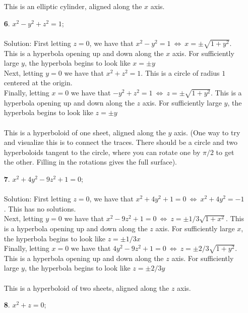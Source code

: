 \documentclass[12pt]{amsbook}
\begin{document}
\begin{enumerate}
\\
\\
This is an elliptic cylinder, aligned along the $x$ axis.
\\
\item[{\small\bf 6}.]\quad  $x^2-y^2+z^2=1$;
\\
\\
{\sc Solution}: First letting $z=0$, we have that $x^2-y^2=1 \ \Leftrightarrow \ x=\pm \sqrt{1+y^2}$. This is a hyperbola opening up and down along the $x$ axis. For sufficiently large $y$, the hyperbola begins to look like $x=\pm y$ 
\\
Next, letting $y=0$ we have that $x^2+z^2=1$. This is a circle of radius $1$ centered at the origin.
\\
Finally, letting $x=0$ we have that $-y^2+z^2=1 \ \Leftrightarrow \ z=\pm \sqrt{1+y^2}$. This is a hyperbola opening up and down along the $z$ axis. For sufficiently large $y$, the hyperbola begins to look like $z=\pm y$ 
\\
\\
This is a hyperboloid of one sheet, aligned along the $y$ axis. (One way to try and visualize this is to connect the traces. There should be a circle and two hyperboloids tangent to the circle, where you can rotate one by $\pi/2$ to get the other. Filling in the rotations gives the full surface). 
\\
\item[{\small\bf 7}.]\quad  $x^2+4y^2-9z^2+1=0$;
 \\
\\
{\sc Solution}: First letting $z=0$, we have that $x^2+4y^2+1=0 \ \Leftrightarrow \ x^2+4y^2=-1$. This has no solutions. 
\\
Next, letting $y=0$ we have that $x^2-9z^2+1=0 \ \Leftrightarrow \ z=\pm 1/3\sqrt{1+x^2}$. This is a hyperbola opening up and down along the $z$ axis. For sufficiently large $x$, the hyperbola begins to look like $z=\pm 1/3x$
\\
Finally, letting $x=0$ we have that $4y^2-9z^2+1=0 \ \Leftrightarrow \ z=\pm 2/3\sqrt{1+y^2}$. This is a hyperbola opening up and down along the $z$ axis. For sufficiently large $y$, the hyperbola begins to look like $z=\pm 2/3y$
\\
\\
This is a hyperboloid of two sheets, aligned along the $z$ axis.
\\
\item[{\small\bf 8}.]\quad  $x^2+z=0$;
\\
\\

\end{enumerate}
\end{document}
